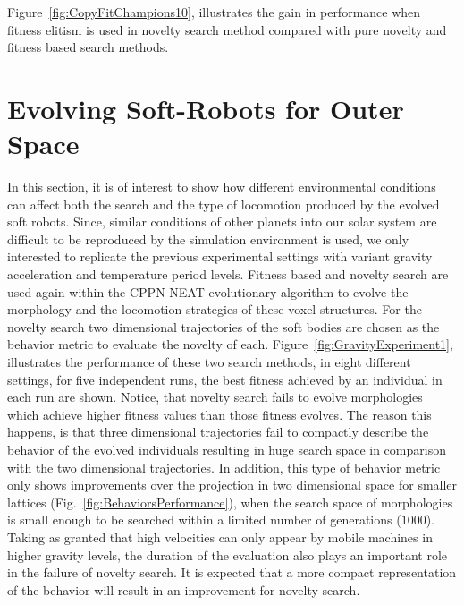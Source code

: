Figure~\ref{fig:CopyFitChampions10}, illustrates the gain in performance when fitness elitism is used in novelty search method compared with pure novelty and fitness based search methods.



\section{Evolving Soft-Robots for Outer Space}  

In this section, it is of interest to show how different environmental conditions can affect both the search and the type of locomotion produced by the evolved soft robots. Since, similar conditions of other planets into our solar system are difficult to be reproduced by the simulation environment is used, we only interested to replicate the previous experimental settings with variant gravity acceleration and temperature period levels. Fitness based and novelty search are used again within the CPPN-NEAT evolutionary algorithm to evolve the morphology and the locomotion strategies of these voxel structures. For the novelty search two dimensional trajectories of the soft bodies are chosen as the behavior metric to evaluate the novelty of each. Figure~\ref{fig:GravityExperiment1}, illustrates the performance of these two search methods, in eight different settings, for five independent runs, the best fitness achieved by an individual in each run are shown. Notice, that novelty search fails to evolve morphologies which achieve higher fitness values than those fitness evolves. The reason this happens, is that three dimensional trajectories fail to compactly describe the behavior of the evolved individuals resulting in huge search space in comparison with the two dimensional trajectories. In addition, this type of behavior metric only shows improvements over the projection in two dimensional space for smaller lattices (Fig.~\ref{fig:BehaviorsPerformance}), when the search space of morphologies is small enough to be searched within a limited number of generations ($1000$). Taking as granted that high velocities can only appear by mobile machines in higher gravity levels, the duration of the evaluation also plays an important role in the failure of novelty search. It is expected that a more compact representation of the behavior will result in an improvement for novelty search.

